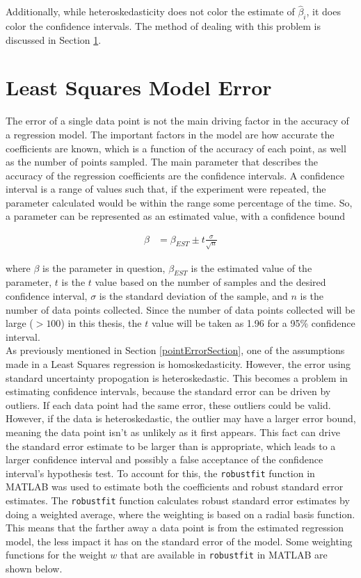 Additionally, while heteroskedasticity does not color the estimate of $\hat{\beta}_i$, it does color the confidence intervals. The method of dealing with this problem is discussed in Section \ref{leastSquaresError}.


\section{Least Squares Model Error}
\label{leastSquaresError}
The error of a single data point is not the main driving factor in the accuracy of a regression model. The important factors in the model are how accurate the coefficients are known, which is a function of the accuracy of each point, as well as the number of points sampled. The main parameter that describes the accuracy of the regression coefficients are the confidence intervals. A confidence interval is a range of values such that, if the experiment were repeated, the parameter calculated would be within the range some percentage of the time. So, a parameter can be represented as an estimated value, with a confidence bound

\begin{align}
\label{confidenceInterval}
\beta &= \beta_{EST} \pm t\frac{\sigma}{\sqrt{n}}
\end{align}

where $\beta$ is the parameter in question, $\beta_{EST}$ is the estimated value of the parameter, $t$ is the $t$ value based on the number of samples and the desired confidence interval, $\sigma$ is the standard deviation of the sample, and $n$ is the number of data points collected. Since  the number of data points collected will be large ($>100$) in this thesis, the $t$ value will be taken as 1.96 for a 95\% confidence interval.\\

As previously mentioned in Section \ref{pointErrorSection}, one of the assumptions made in a Least Squares regression is homoskedasticity. However, the error using standard uncertainty propogation is heteroskedastic. This becomes a problem in estimating confidence intervals, because the standard error can be driven by outliers. If each data point had the same error, these outliers could be valid. However, if the data is heteroskedastic, the outlier may have a larger error bound, meaning the data point isn't as unlikely as it first appears. This fact can drive the standard error estimate to be larger than is appropriate, which leads to a larger confidence interval and possibly a false acceptance of the confidence interval's hypothesis test. To account for this, the \texttt{robustfit} function in MATLAB  was used to estimate both the coefficients and robust standard error estimates. The \texttt{robustfit} function calculates robust standard error estimates by doing a weighted average, where the weighting is based on a radial basis function. This means that the farther away a data point is from the estimated regression model, the less impact it has on the standard error of the model. Some weighting functions for the weight $w$ that are available in \texttt{robustfit} in MATLAB are shown below.

